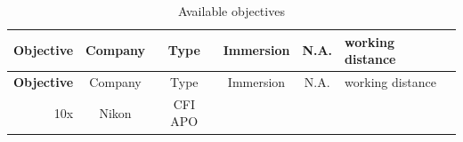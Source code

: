 \documentclass[11pt,singlespacinge,twoside]{reedthesis} %
\theoremstyle{definition}
\theoremstyle{definition}
\theoremstyle{definition}
\theoremstyle{remark}
\begin{document}
\begin{longtable}[]{@{}rccccl@{}}
\caption{\label{tab:objectives} Available objectives}\tabularnewline
\toprule
\begin{minipage}[b]{0.16\columnwidth}\raggedleft
\textbf{Objective}\strut
\end{minipage} & \begin{minipage}[b]{0.11\columnwidth}\centering
Company\strut
\end{minipage} & \begin{minipage}[b]{0.14\columnwidth}\centering
Type\strut
\end{minipage} & \begin{minipage}[b]{0.13\columnwidth}\centering
Immersion\strut
\end{minipage} & \begin{minipage}[b]{0.08\columnwidth}\centering
N.A.\strut
\end{minipage} & \begin{minipage}[b]{0.21\columnwidth}\raggedright
working distance\strut
\end{minipage}\tabularnewline
\midrule
\endfirsthead
\toprule
\begin{minipage}[b]{0.16\columnwidth}\raggedleft
\textbf{Objective}\strut
\end{minipage} & \begin{minipage}[b]{0.11\columnwidth}\centering
Company\strut
\end{minipage} & \begin{minipage}[b]{0.14\columnwidth}\centering
Type\strut
\end{minipage} & \begin{minipage}[b]{0.13\columnwidth}\centering
Immersion\strut
\end{minipage} & \begin{minipage}[b]{0.08\columnwidth}\centering
N.A.\strut
\end{minipage} & \begin{minipage}[b]{0.21\columnwidth}\raggedright
working distance\strut
\end{minipage}\tabularnewline
\midrule
\endhead
\begin{minipage}[t]{0.16\columnwidth}\raggedleft
10x\strut
\end{minipage} & \begin{minipage}[t]{0.11\columnwidth}\centering
Nikon\strut
\end{minipage} & \begin{minipage}[t]{0.14\columnwidth}\centering
CFI APO\strut
\end{minipage} & \begin{minipage}[t]{0.13\columnwidth}\centering

\end{minipage}
\end{longtable}
\end{document}
